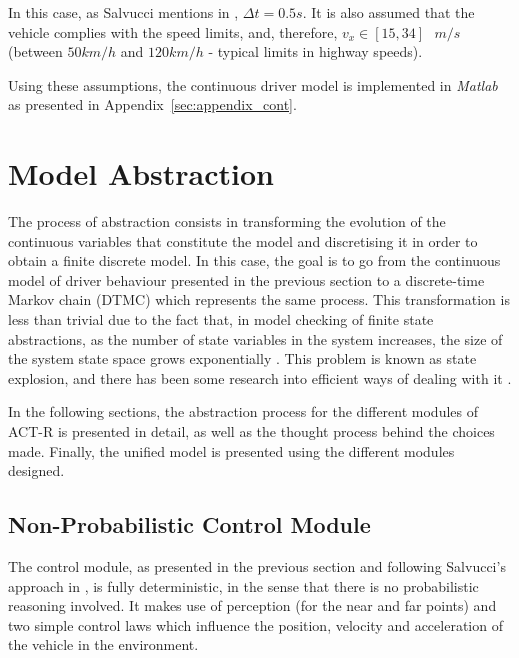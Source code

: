 In this case, as Salvucci mentions in \cite{salvucci_1}, $\Delta t = 0.5s$. It is also assumed that the vehicle complies with the speed limits, and, therefore, $v_x \in [15, 34]\text{ }m/s$ (between $50km/h$ and $120km/h$ - typical limits in highway speeds).

Using these assumptions, the continuous driver model is implemented in \textit{Matlab} as presented in Appendix~\ref{sec:appendix_cont}.

\section{Model Abstraction}

The process of abstraction consists in transforming the evolution of the continuous variables that constitute the model and discretising it in order to obtain a finite discrete model. In this case, the goal is to go from the continuous model of driver behaviour presented in the previous section to a discrete-time Markov chain (DTMC) which represents the same process. This transformation is less than trivial due to the fact that, in model checking of finite state abstractions, as the number of state variables in the system increases, the size of the system state space grows exponentially \cite{state_explosion}. This problem is known as state explosion, and there has been some research into efficient ways of dealing with it \cite{abstraction_1, abstraction_2}. 

In the following sections, the abstraction process for the different modules of ACT-R is presented in detail, as well as the thought process behind the choices made. Finally, the unified model is presented using the different modules designed.

\subsection{Non-Probabilistic Control Module}
\label{sec:non_prob_control}

The control module, as presented in the previous section and following Salvucci's approach in \cite{salvucci_1}, is fully deterministic, in the sense that there is no probabilistic reasoning involved. It makes use of perception (for the near and far points) and two simple control laws which influence the position, velocity and acceleration of the vehicle in the environment.

